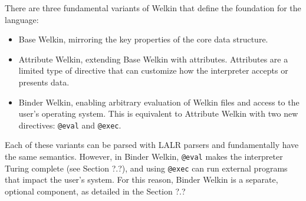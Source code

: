 There are three fundamental variants of Welkin that define the foundation for the language:
\begin{itemize}
	\item Base Welkin, mirroring the key properties of the core data structure.
	\item Attribute Welkin, extending Base Welkin with attributes. Attributes are a limited type of directive that can customize how the interpreter accepts or presents data.
	\item Binder Welkin, enabling arbitrary evaluation of Welkin files and access to the user's operating system. This is equivalent to Attribute Welkin with two new directives: \texttt{@eval} and \texttt{@exec}. \end{itemize}
Each of these variants can be parsed with LALR parsers and fundamentally have the same semantics. However, in Binder Welkin, \texttt{@eval} makes the interpreter Turing complete (see Section ?.?), and using \texttt{@exec} can run external programs that impact the user's system. For this reason, Binder Welkin is a separate, optional component, as detailed in the Section ?.?
